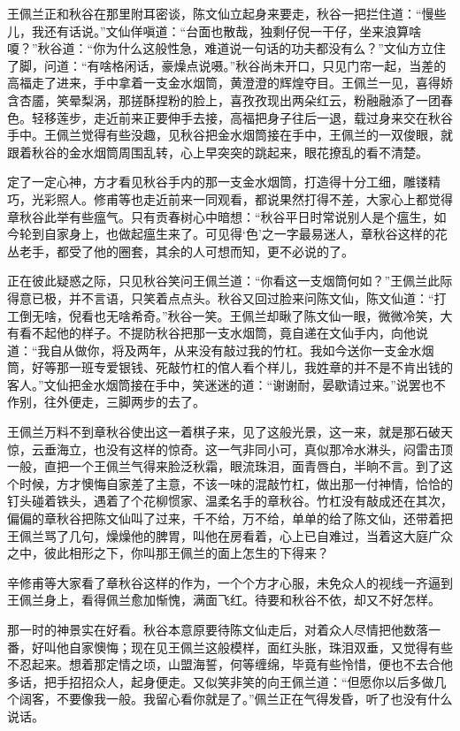 \documentclass[12pt,UTF8]{ctexbook}
\begin{document}
{{{王佩兰正和秋谷在那里附耳密谈，陈文仙立起身来要走，秋谷一把拦住道：“慢些儿，我还有话说。”文仙佯嗔道：“台面也散哉，独剩仔倪一干仔，坐来浪算啥嗄？”秋谷道：“你为什么这般性急，难道说一句话的功夫都没有么？”文仙方立住了脚，问道：“有啥格闲话，豪燥点说嗫。”秋谷尚未开口，只见门帘一起，当差的高福走了进来，手中拿着一支金水烟筒，黄澄澄的辉煌夺目。王佩兰一见，喜得娇含杏靥，笑晕梨涡，那搓酥捏粉的脸上，喜孜孜现出两朵红云，粉融融添了一团春色。轻移莲步，走近前来正要伸手去接，高福把身子往后一退，载过身来交在秋谷手中。王佩兰觉得有些没趣，见秋谷把金水烟筒接在手中，王佩兰的一双俊眼，就跟着秋谷的金水烟筒周围乱转，心上早突突的跳起来，眼花撩乱的看不清楚。

定了一定心神，方才看见秋谷手内的那一支金水烟筒，打造得十分工细，雕镂精巧，光彩照人。修甫等也走近前来一同观看，都说果然打得不差，大家心上都觉得章秋谷此举有些瘟气。只有贡春树心中暗想：“秋谷平日时常说别人是个瘟生，如今轮到自家身上，也做起瘟生来了。可见得‘色’之一字最易迷人，章秋谷这样的花丛老手，都受了他的圈套，其余的人可想而知，更不必说的了。

正在彼此疑惑之际，只见秋谷笑问王佩兰道：“你看这一支烟筒何如？”王佩兰此际得意已极，并不言语，只笑着点点头。秋谷又回过脸来问陈文仙，陈文仙道：“打工倒无啥，倪看也无啥希奇。”秋谷一笑。王佩兰却瞅了陈文仙一眼，微微冷笑，大有看不起他的样子。不提防秋谷把那一支水烟筒，竟自递在文仙手内，向他说道：“我自从做你，将及两年，从来没有敲过我的竹杠。我如今送你一支金水烟筒，好等那一班专爱银钱、死敲竹杠的倌人看个样儿，我姓章的并不是不肯出钱的客人。”文仙把金水烟筒接在手中，笑迷迷的道：“谢谢耐，晏歇请过来。”说罢也不作别，往外便走，三脚两步的去了。

王佩兰万料不到章秋谷使出这一着棋子来，见了这般光景，这一来，就是那石破天惊，云垂海立，也没有这样的惊奇。这一气非同小可，真似那冷水淋头，闷雷击顶一般，直把一个王佩兰气得来脸泛秋霜，眼流珠泪，面青唇白，半晌不言。到了这个时候，方才懊悔自家差了主意，不该一味的混敲竹杠，做出那一付神情，恰恰的钉头碰着铁头，遇着了个花柳惯家、温柔名手的章秋谷。竹杠没有敲成还在其次，偏偏的章秋谷把陈文仙叫了过来，千不给，万不给，单单的给了陈文仙，还带着把王佩兰骂了几句，燥燥他的脾胃，叫他在房看着，心上已自难过，当着这大庭广众之中，彼此相形之下，你叫那王佩兰的面上怎生的下得来？

辛修甫等大家看了章秋谷这样的作为，一个个方才心服，未免众人的视线一齐逼到王佩兰身上，看得佩兰愈加惭愧，满面飞红。待要和秋谷不依，却又不好怎样。

那一时的神景实在好看。秋谷本意原要待陈文仙走后，对着众人尽情把他数落一番，好叫他自家懊悔；现在见王佩兰这般模样，面红头胀，珠泪双垂，又觉得有些不忍起来。想着那定情之顷，山盟海誓，何等缠绵，毕竟有些怜惜，便也不去合他多话，把手招招众人，起身便走。又似笑非笑的向王佩兰道：“但愿你以后多做几个阔客，不要像我一般。我留心看你就是了。”佩兰正在气得发昏，听了也没有什么说话。

}}}
\end{document}
